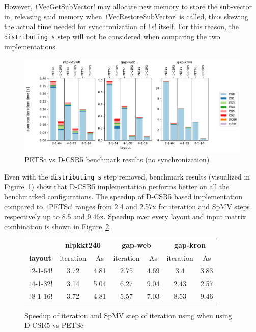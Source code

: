 \documentclass[thesis=M,english]{FITthesis}[2019/12/23]
\newcommand{\csre}[1]{\texttt!#1!}
\begin{document}
However, \csre{VecGetSubVector} may allocate new memory to store the sub-vector in, releasing said memory
when \csre{VecRestoreSubVector} is called, thus skewing the actual time needed for synchronization of
\csre{s} itself. For this reason, the \texttt{distributing s} step will not be considered when comparing
the two implemen\-tations.

\begin{figure}[htp]
    \centering
    \includegraphics[scale=0.5]{static/petsc_vs_dim.pdf}
    \caption{PETSc vs D-CSR5 benchmark results (no synchronization)}\label{bench:petsc:vsDim}
\end{figure}

Even with the \texttt{distributing s} step removed, benchmark results (visualized in
Figure~\ref{bench:petsc:vsDim}) show that D-CSR5 implementation performs better
on all the benchmarked configurations. The speedup of D-CSR5 based implementation compared to \csre{PETSc}
ranges from 2.4 and 2.57x for iteration and SpMV steps respectively up to 8.5 and 9.46x. Speedup over every
layout and input matrix combination is shown in Figure~\ref{bench:petsc:table}.


\begin{figure}[htp]
    \centering
    \begin{tabular}{*{7}{c}}
        \toprule
                        & \multicolumn{2}{c}{\textbf{nlpkkt240}} & \multicolumn{2}{c}{\textbf{gap-web}} & \multicolumn{2}{c}{\textbf{gap-kron}}                           \\
        \cmidrule(lr){2-3} \cmidrule(lr){4-5} \cmidrule(lr){6-7}
        \textbf{layout} & iteration                              & As                                   & iteration                             & As   & iteration & As   \\
        \midrule
        \csre{2-1-64}   & 3.72                                   & 4.81                                 & 2.75                                  & 4.69 & 3.4       & 3.83 \\
        \csre{4-1-32}   & 3.14                                   & 5.04                                 & 6.27                                  & 9.04 & 2.43      & 2.57 \\
        \csre{8-1-16}   & 3.72                                   & 4.81                                 & 5.57                                  & 7.03 & 8.53      & 9.46 \\
        \bottomrule
    \end{tabular}
    \caption{Speedup of iteration and SpMV step of iteration using when using D-CSR5 vs PETSc}\label{bench:petsc:table}
\end{figure}
\end{document}
